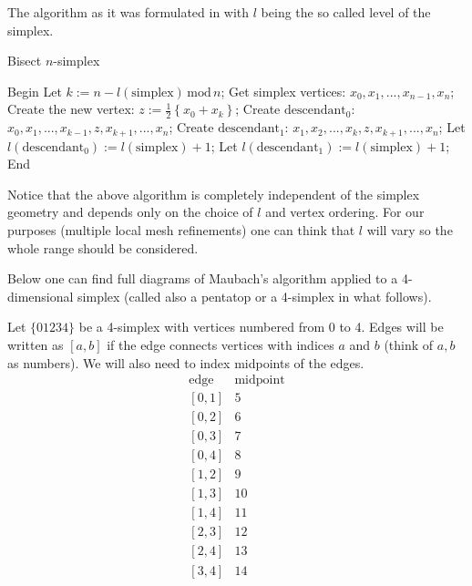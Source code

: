\documentclass[a4paper,12pt]{amsart}
\numberwithin{equation}{section}
\begin{document}
The algorithm as it was formulated in \cite{maubach} with $l$ being the so called level of the simplex.
\begin{algorithm}
    \caption{Bisect $n$-simplex}
    \label{euclid}
    \begin{algorithmic}[1] %
            \State Begin
            \State Let $k:= n - l(\mbox{simplex}) \, \mbox{mod} \, n$;
            \State Get simplex vertices: $x_0, x_1, ..., x_{n-1}, x_n$;
            \State Create the new vertex: $z := \frac{1}{2} \left\{ x_0 + x_k \right\}$;
            \State Create $\mbox{descendant}_0$: $x_0, x_1, ..., x_{k-1}, z, x_{k+1}, ..., x_n$;
            \State Create $\mbox{descendant}_1$: $x_1, x_2, ..., x_k, z, x_{k+1}, ..., x_n$;
            \State Let $l(\mbox{descendant}_0) := l(\mbox{simplex}) + 1$;
            \State Let $l(\mbox{descendant}_1) := l(\mbox{simplex}) + 1$;
            \State End
    \end{algorithmic}
\end{algorithm}
Notice that the above algorithm is completely independent of the simplex geometry and depends only on the choice of $l$ and vertex ordering. For our purposes (multiple local mesh refinements) one can think that $l$ will vary so the whole range should be considered.

Below one can find full diagrams of Maubach's algorithm applied to a 4-dimensional simplex (called also a pentatop or a 4-simplex in what follows).

Let $\{01234\}$ be a 4-simplex with vertices numbered from 0 to 4. Edges will be written as $[a,b]$ if the edge connects vertices with indices $a$ and $b$ (think of $a,b$ as numbers).
We will also need to index midpoints of the edges. 
$$
\begin{array}{cc}
\mbox{edge} & \mbox{midpoint} \\
\left[0,1\right] & 5 \\
\left[0,2\right] & 6 \\
\left[0,3\right] & 7 \\
\left[0,4\right] & 8 \\
\left[1,2\right] & 9 \\
\left[1,3\right] & 10 \\
\left[1,4\right] & 11 \\
\left[2,3\right] & 12 \\
\left[2,4\right] & 13 \\
\left[3,4\right] & 14 \\
\end{array}
$$
\end{document}
